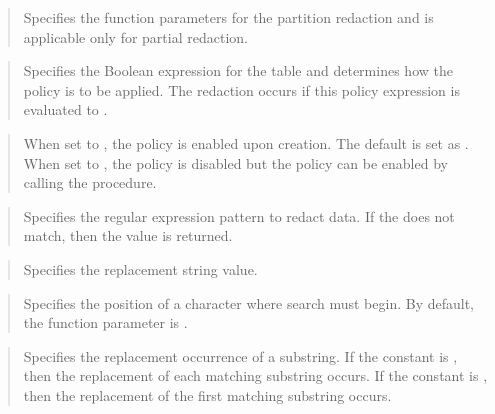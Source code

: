 \documentclass[letterpaper,10pt,english,openany,oneside]{sphinxmanual}
\begin{document}
\begin{quote}

Specifies the function parameters for the partition redaction and is
applicable only for partial redaction.
\end{quote}

\newpage

\begin{quote}

Specifies the Boolean expression for the table and determines how the
policy is to be applied. The redaction occurs if this policy expression
is evaluated to .
\end{quote}

\begin{quote}

When set to , the policy is enabled upon creation. The default is
set as . When set to , the policy is disabled but the policy
can be enabled by calling the  procedure.
\end{quote}

\begin{quote}

Specifies the regular expression pattern to redact data. If the
 does not match, then the  value is returned.
\end{quote}

\begin{quote}

Specifies the replacement string value.
\end{quote}

\begin{quote}

Specifies the position of a character where search must begin. By
default, the function parameter is .
\end{quote}

\begin{quote}

Specifies the replacement occurrence of a substring. If the constant is
, then the replacement of each matching substring occurs. If the
constant is , then the replacement of the first matching
substring occurs.
\end{quote}
\end{document}
